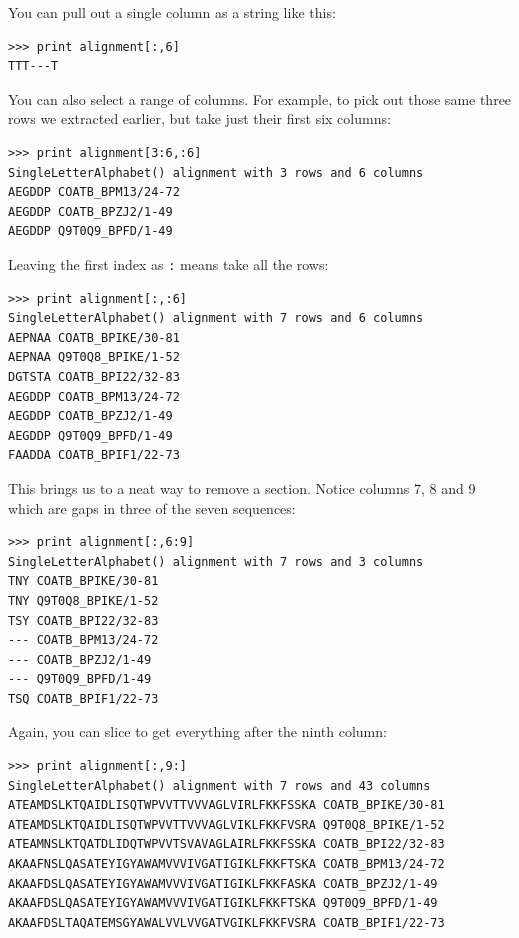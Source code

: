 \documentclass{report}
\begin{document}
You can pull out a single column as a string like this:

\begin{verbatim}
>>> print alignment[:,6]
TTT---T
\end{verbatim}

You can also select a range of columns. For example, to pick out those same
three rows we extracted earlier, but take just their first six columns:

\begin{verbatim}
>>> print alignment[3:6,:6]
SingleLetterAlphabet() alignment with 3 rows and 6 columns
AEGDDP COATB_BPM13/24-72
AEGDDP COATB_BPZJ2/1-49
AEGDDP Q9T0Q9_BPFD/1-49
\end{verbatim}

Leaving the first index as \verb|:| means take all the rows:

\begin{verbatim}
>>> print alignment[:,:6]
SingleLetterAlphabet() alignment with 7 rows and 6 columns
AEPNAA COATB_BPIKE/30-81
AEPNAA Q9T0Q8_BPIKE/1-52
DGTSTA COATB_BPI22/32-83
AEGDDP COATB_BPM13/24-72
AEGDDP COATB_BPZJ2/1-49
AEGDDP Q9T0Q9_BPFD/1-49
FAADDA COATB_BPIF1/22-73
\end{verbatim}

This brings us to a neat way to remove a section. Notice columns
7, 8 and 9 which are gaps in three of the seven sequences:

\begin{verbatim}
>>> print alignment[:,6:9]
SingleLetterAlphabet() alignment with 7 rows and 3 columns
TNY COATB_BPIKE/30-81
TNY Q9T0Q8_BPIKE/1-52
TSY COATB_BPI22/32-83
--- COATB_BPM13/24-72
--- COATB_BPZJ2/1-49
--- Q9T0Q9_BPFD/1-49
TSQ COATB_BPIF1/22-73
\end{verbatim}

\noindent Again, you can slice to get everything after the ninth column:

\begin{verbatim}>>> print alignment[:,9:]
SingleLetterAlphabet() alignment with 7 rows and 43 columns
ATEAMDSLKTQAIDLISQTWPVVTTVVVAGLVIRLFKKFSSKA COATB_BPIKE/30-81
ATEAMDSLKTQAIDLISQTWPVVTTVVVAGLVIKLFKKFVSRA Q9T0Q8_BPIKE/1-52
ATEAMNSLKTQATDLIDQTWPVVTSVAVAGLAIRLFKKFSSKA COATB_BPI22/32-83
AKAAFNSLQASATEYIGYAWAMVVVIVGATIGIKLFKKFTSKA COATB_BPM13/24-72
AKAAFDSLQASATEYIGYAWAMVVVIVGATIGIKLFKKFASKA COATB_BPZJ2/1-49
AKAAFDSLQASATEYIGYAWAMVVVIVGATIGIKLFKKFTSKA Q9T0Q9_BPFD/1-49
AKAAFDSLTAQATEMSGYAWALVVLVVGATVGIKLFKKFVSRA COATB_BPIF1/22-73
\end{verbatim}
\end{document}

